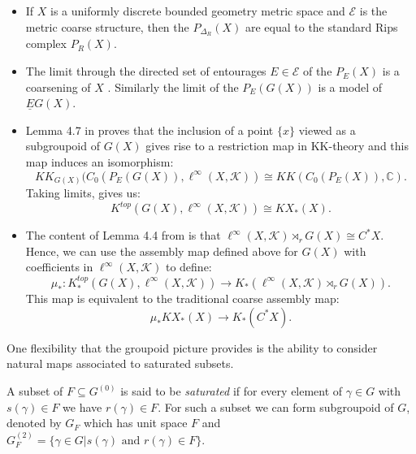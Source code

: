 \begin{remark}
\begin{itemize}
\item If $X$ is a uniformly discrete bounded geometry metric space and $\mathcal{E}$ is the metric coarse structure, then the $P_{\Delta_{R}}(X)$ are equal to the standard Rips complex $P_{R}(X)$.
\item The limit through the directed set of entourages $E \in \mathcal{E}$ of the $P_{E}(X)$ is a coarsening of $X$ \cite{MR1399087}. Similarly the limit of the $P_{E}(G(X))$ is a model of $\underline{E}G(X)$.
\item Lemma 4.7 in \cite{MR1905840} proves that the inclusion of a point $\lbrace x \rbrace$ viewed as a subgroupoid of $G(X)$ gives rise to a restriction map in KK-theory and this map induces an isomorphism:
\begin{equation*}
KK_{G(X)}(C_{0}(P_{E}(G(X)),\ell^{\infty}(X,\mathcal{K})) \cong KK(C_{0}(P_{E}(X)),\mathbb{C}).
\end{equation*}
Taking limits, gives us:
\begin{equation*}
K^{top}(G(X),\ell^{\infty}(X,\mathcal{K})) \cong KX_{*}(X).
\end{equation*}
\item The content of Lemma 4.4 from \cite{MR1905840} is that $\ell^{\infty}(X,\mathcal{K}) \rtimes_{r} G(X) \cong C^{*}X$. Hence, we can use the assembly map defined above for $G(X)$ with coefficients in $\ell^{\infty}(X,\mathcal{K})$ to define:
\begin{equation*}
\mu_{*}:K^{top}_{*}(G(X),\ell^{\infty}(X,\mathcal{K})) \rightarrow K_{*}(\ell^{\infty}(X,\mathcal{K})\rtimes_{r}G(X)).
\end{equation*}
This map is equivalent to the traditional coarse assembly map:
\begin{equation*}
\mu_{*}KX_{*}(X)\rightarrow K_{*}(C^{*}X).
\end{equation*}
\end{itemize}
\end{remark}

One flexibility that the groupoid picture provides is the ability to consider natural maps associated to saturated subsets.
\begin{definition}
A subset of $F\subseteq G^{(0)}$ is said to be \textit{saturated} if for every element of $\gamma \in G$ with $s(\gamma) \in F$ we have $r(\gamma) \in F$. For such a subset we can form subgroupoid of $G$, denoted by $G_{F}$ which has unit space $F$ and $G_{F}^{(2)}=\lbrace \gamma \in G | s(\gamma) \mbox{ and } r(\gamma) \in F \rbrace$.
\end{definition}

